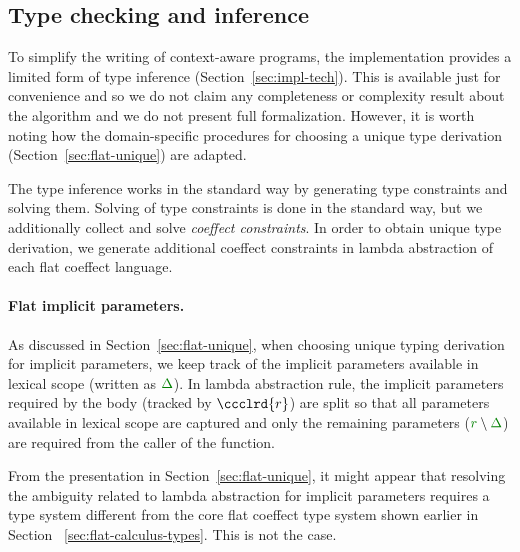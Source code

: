 
\subsection{Type checking and inference}
\label{sec:impl-theory-typing}

To simplify the writing of context-aware programs, the implementation provides a limited form of
type inference (Section~\ref{sec:impl-tech}). This is available just for convenience and so we do
not claim any completeness or complexity result about the algorithm and we do not present full
formalization. However, it is worth noting how the domain-specific procedures for choosing a unique
type derivation (Section~\ref{sec:flat-unique}) are adapted.

The type inference works in the standard way \cite{types-mlessence,types-inference} by generating
type constraints and solving them. Solving of type constraints is done in the standard way, but we
additionally collect and solve \emph{coeffect constraints}. In order to obtain unique type
derivation, we generate additional coeffect constraints in lambda abstraction of each flat
coeffect language.

\paragraph{Flat implicit parameters.}

As discussed in Section~\ref{sec:flat-unique}, when choosing unique typing derivation for
implicit parameters, we keep track of the implicit parameters available in lexical scope
(written as $\cclrd{\Delta}$). In lambda abstraction rule, the implicit parameters required by
the body (tracked by $\ccclrd{r}$) are split so that all parameters available in lexical scope
are captured and only the remaining parameters ($\cclrd{r}\setminus\cclrd{\Delta}$) are required
from the caller of the function.

From the presentation in Section~\ref{sec:flat-unique}, it might appear that resolving the ambiguity
related to lambda abstraction for implicit parameters requires a type system different from
the core flat coeffect type system shown earlier in Section ~\ref{sec:flat-calculus-types}.
This is not the case.

